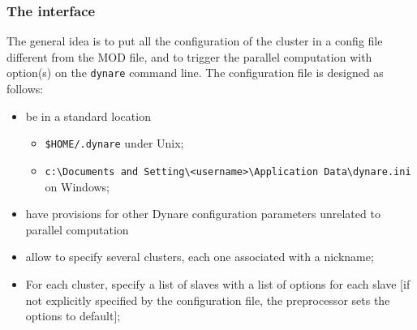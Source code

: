 \documentclass[12pt,a4paper,pdftex]{article}
\begin{document}
\subsubsection{The interface}
The general idea is to put all the configuration of the cluster in a config file different from the MOD file, and to trigger the parallel computation with option(s) on the \verb"dynare" command line.
The configuration file is designed as follows:
\begin{itemize}
  \item be in a standard location
   \begin{itemize}
   \item {\footnotesize\verb"$HOME/.dynare"} under Unix;
   \item {\footnotesize\verb"c:\Documents and Setting\<username>\Application Data\dynare.ini"} on Windows;
   \end{itemize}
  \item have provisions for other Dynare configuration parameters unrelated to parallel computation
  \item allow to specify several clusters, each one associated with a nickname;
  \item For each cluster, specify a list of slaves with a list of options for each slave [if not explicitly specified by the configuration file, the preprocessor sets the options to default];
\end{itemize}
\end{document}
